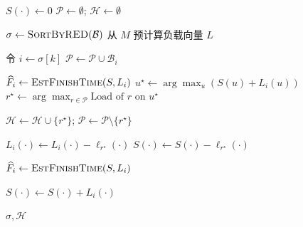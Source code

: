 \begin{algorithm}[t!]
    \caption{请求间调度}
    \small
    \label{alg:ETScheduling_Min}
    \begin{algorithmic}[1]

        \State $S(\cdot) \gets 0$ 
        \State $\mathcal{P} \gets \emptyset$; \quad $\mathcal{H} \gets \emptyset$

        \State $\sigma \gets \Call{SortByRED}{\mathcal{B}}$
        \State 从 $M$ 预计算负载向量 $L$

            \State 令 $i \gets \sigma[k]$
            \State $\mathcal{P} \gets \mathcal{P} \cup \mathcal{B}_i$ 

            \State $\widehat{F}_i \gets \Call{EstFinishTime}{S, L_i}$
                \State $u^\star \gets \arg\max_u (S(u) + L_i(u))$ 
                \State $r^\star \gets \arg\max_{r \in \mathcal{P}} \text{Load of } r \text{ on } u^\star$

                \State $\mathcal{H} \gets \mathcal{H} \cup \{r^\star\}$; \quad $\mathcal{P} \gets \mathcal{P} \setminus \{r^\star\}$

                 
                    \State $L_i(\cdot)\gets L_i(\cdot)-\ell_{r^\star}(\cdot)$
                \Else {}
                    \State $S(\cdot)\gets S(\cdot)-\ell_{r^\star}(\cdot)$
                \EndIf

                \State $\widehat{F}_i \gets \Call{EstFinishTime}{S, L_i}$
            \EndWhile

            \State $S(\cdot) \gets S(\cdot) + L_i(\cdot)$ 
        \EndFor

        \State \Return $\sigma, \mathcal{H}$
    \EndProcedure
    \end{algorithmic}
\end{algorithm}
